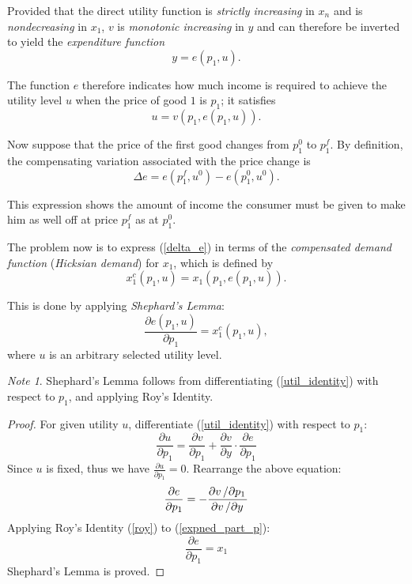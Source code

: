 \documentclass[12pt,a4paper]{article}
\theoremstyle{plain}%
\theoremstyle{definition}
\theoremstyle{remark}
\newtheorem*{note}{Note}
\newcommand{\partfrac}[2]{\frac{\partial #1}{\partial #2}}
\newcommand{\partline}[2]{\partial #1 \left/ \partial #2 \right.}
\begin{document}
Provided that the direct utility function is \emph{strictly increasing} in $x_n$ and is 
\emph{nondecreasing} in $x_1$, $v$ is \emph{monotonic increasing} in $y$ and can 
therefore be inverted to yield the \emph{expenditure function} 
\begin{equation} \label{expend}
	y = e(p_1, u). 
\end{equation}

The function $e$ therefore indicates how much income is required to achieve the utility level 
$u$ when the price of good $1$ is $p_1$; it satisfies 
\begin{equation} \label{util_identity}
	u = v(p_1, e(p_1,u)). 
\end{equation}

Now suppose that the price of the first good changes from $p_1^0$ to $p_1^f$. By definition, 
the compensating variation associated with the price change is 
\begin{equation} \label{delta_e}
	\Delta e = e(p_1^f, u^0) - e(p_1^0, u^0). 
\end{equation}

This expression shows the amount of income the consumer must be given to make him as well off 
at price $p_1^f$ as at $p_1^0$. 

The problem now is to express (\ref{delta_e}) in terms of the \emph{compensated demand function} 
(\emph{Hicksian demand}) for $x_1$, which is defined by 
\begin{equation} \label{compensated_demand}
	x_1^c (p_1, u) = x_1 (p_1, e(p_1, u)). 
\end{equation}

This is done by applying \emph{Shephard's Lemma}: 
\begin{equation} \label{shephard}
	\frac{\partial e(p_1, u)}%
		 {\partial p_1} = x_1^c (p_1, u), 
\end{equation}
where $u$ is an arbitrary selected utility level. 

\begin{note}
	Shephard's Lemma follows from differentiating (\ref{util_identity}) with respect to $p_1$, 
	and applying Roy's Identity. 
\end{note}

\begin{proof}\label{pf:shephard}
	For given utility $u$, differentiate (\ref{util_identity}) with respect to $p_1$: 
	\begin{equation}
		\partfrac{u}{p_1} = \partfrac{v}{p_1} + \partfrac{v}{y} \cdot \partfrac{e}{p_1}
	\end{equation}
	Since $u$ is fixed, thus we have $\partfrac{u}{p_1} = 0$. Rearrange the above equation: 
	\begin{equation}
		\label{expned_part_p}
		\partfrac{e}{p_1} = -\frac{\partline{v}{p_1}}{\partline{v}{y}} 
	\end{equation}
	Applying Roy's Identity (\ref{roy}) to (\ref{expned_part_p}): 
	\begin{equation}
		\partfrac{e}{p_1} = x_1
	\end{equation}
	Shephard's Lemma is proved. 
\end{proof}
\end{document}

